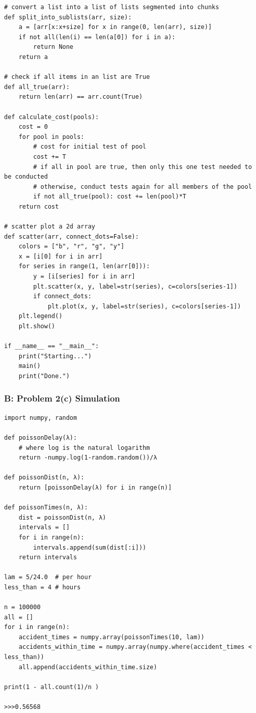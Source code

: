 \documentclass[11pt]{extarticle}
\begin{document}
\begin{verbatim}
# convert a list into a list of lists segmented into chunks 
def split_into_sublists(arr, size):
    a = [arr[x:x+size] for x in range(0, len(arr), size)]
    if not all(len(i) == len(a[0]) for i in a):
        return None 
    return a  

# check if all items in an list are True
def all_true(arr):
    return len(arr) == arr.count(True)

def calculate_cost(pools):
    cost = 0
    for pool in pools:
        # cost for initial test of pool
        cost += T
        # if all in pool are true, then only this one test needed to be conducted
        # otherwise, conduct tests again for all members of the pool
        if not all_true(pool): cost += len(pool)*T
    return cost 

# scatter plot a 2d array
def scatter(arr, connect_dots=False):
    colors = ["b", "r", "g", "y"]
    x = [i[0] for i in arr]
    for series in range(1, len(arr[0])):
        y = [i[series] for i in arr]
        plt.scatter(x, y, label=str(series), c=colors[series-1])
        if connect_dots: 
            plt.plot(x, y, label=str(series), c=colors[series-1])
    plt.legend()
    plt.show()

if __name__ == "__main__":
    print("Starting...")
    main()
    print("Done.")
\end{verbatim}


\subsubsection*{B: Problem 2(c) Simulation}

\scriptsize
\begin{verbatim}
import numpy, random

def poissonDelay(λ):
    # where log is the natural logarithm
    return -numpy.log(1-random.random())/λ

def poissonDist(n, λ):
    return [poissonDelay(λ) for i in range(n)]

def poissonTimes(n, λ):
    dist = poissonDist(n, λ)
    intervals = []
    for i in range(n):
        intervals.append(sum(dist[:i]))
    return intervals

lam = 5/24.0  # per hour
less_than = 4 # hours

n = 100000
all = []
for i in range(n):
    accident_times = numpy.array(poissonTimes(10, lam))
    accidents_within_time = numpy.array(numpy.where(accident_times < less_than))
    all.append(accidents_within_time.size)

print(1 - all.count(1)/n )

>>>0.56568 

\end{verbatim}
\normalsize
\end{document}
